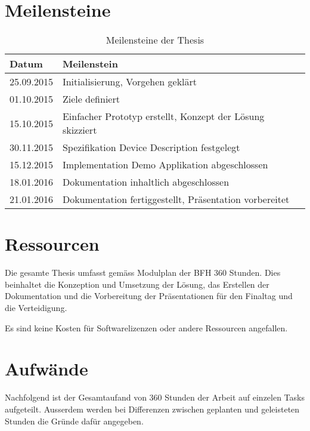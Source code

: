 \section{Meilensteine}

\begin{table}[H]
\begin{tabularx}{\textwidth}{|l|X|}

 \hline \rowcolor{lightgray}
 {\bf Datum } & {\bf Meilenstein } \\  \hline
 
 25.09.2015  &   Initialisierung, Vorgehen geklärt      \\ \hline
 01.10.2015  &   Ziele definiert      \\ \hline
 15.10.2015  &   Einfacher Prototyp erstellt, Konzept der Lösung skizziert     \\ \hline
 30.11.2015  &   Spezifikation Device Description festgelegt     \\ \hline
 15.12.2015  &   Implementation Demo Applikation abgeschlossen     \\ \hline
 18.01.2016  &   Dokumentation inhaltlich abgeschlossen      \\ \hline
 21.01.2016  &   Dokumentation fertiggestellt, Präsentation vorbereitet     \\ \hline
 
\end{tabularx}
\caption{Meilensteine der Thesis}
\end{table}


\section{Ressourcen}

Die gesamte Thesis umfasst gemäss Modulplan der BFH 360 Stunden. Dies beinhaltet die Konzeption und Umsetzung der Lösung, das Erstellen der Dokumentation und die Vorbereitung der Präsentationen für den Finaltag und die Verteidigung.

Es sind keine Kosten für Softwarelizenzen oder andere Ressourcen angefallen.


\section{Aufwände}
Nachfolgend ist der Gesamtaufand von 360 Stunden der Arbeit auf einzelen Tasks aufgeteilt. Ausserdem werden bei Differenzen zwischen geplanten und geleisteten Stunden die Gründe dafür angegeben.

